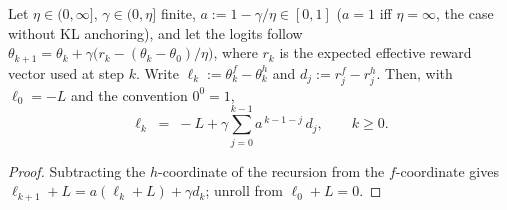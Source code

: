 \begin{lemma}\label{lem:audit-logodds}
Let $\eta\in(0,\infty]$, $\gamma\in(0,\eta]$ finite, $a:=1-\gamma/\eta\in[0,1]$
($a=1$ iff $\eta=\infty$, the case without KL anchoring), and let the logits
follow $\theta_{k+1}=\theta_k+\gamma\bigl(r_k-(\theta_k-\theta_0)/\eta\bigr)$,
where $r_k$ is the expected effective reward vector used at step $k$. Write
$\ell_k:=\theta_k^{f}-\theta_k^{h}$ and $d_j:=r_j^{f}-r_j^{h}$. Then, with
$\ell_0=-L$ and the convention $0^0=1$,
\begin{equation}\label{eq:audit-logodds}
  \ell_k \;=\; -L+\gamma\sum_{j=0}^{k-1}a^{\,k-1-j}\,d_j ,\qquad k\ge 0 .
\end{equation}
\end{lemma}
\begin{proof}
Subtracting the $h$-coordinate of the recursion from the $f$-coordinate gives
$\ell_{k+1}+L=a(\ell_k+L)+\gamma d_k$; unroll from $\ell_0+L=0$.
\end{proof}

